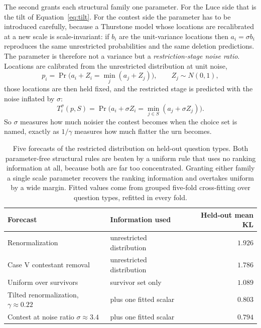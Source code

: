 \documentclass[11pt]{article}
\begin{document}
The second grants each structural family one parameter. For the Luce side that
is the tilt of Equation~\eqref{eq:tilt}. For the contest side the parameter has
to be introduced carefully, because a Thurstone model whose locations are
recalibrated at a new scale is scale-invariant: if $b_i$ are the unit-variance
locations then $a_i = \sigma b_i$ reproduces the same unrestricted
probabilities and the same deletion predictions. The parameter is therefore not
a variance but a \emph{restriction-stage noise ratio}. Locations are calibrated
from the unrestricted distribution at unit noise,
\begin{equation}
p_i = \Pr\bigl(a_i + Z_i = \min_j (a_j + Z_j)\bigr), \qquad Z_j \sim N(0,1),
\label{eq:calib}
\end{equation}
those locations are then held fixed, and the restricted stage is predicted with
the noise inflated by $\sigma$:
\begin{equation}
T^{\sigma}_i(p, S) =
  \Pr\bigl(a_i + \sigma Z_i = \min_{j \in S}(a_j + \sigma Z_j)\bigr).
\label{eq:sigma}
\end{equation}
So $\sigma$ measures how much noisier the contest becomes when the choice set
is named, exactly as $1/\gamma$ measures how much flatter the urn becomes.

\begin{table}[ht]
\centering
\small
\begin{tabular}{llr}
\toprule
Forecast & Information used & Held-out mean KL \\
\midrule
Renormalization & unrestricted distribution & $1.926$ \\
Case V contestant removal & unrestricted distribution & $1.786$ \\
Uniform over survivors & survivor set only & $1.089$ \\
\midrule
Tilted renormalization, $\gamma \approx 0.22$ & plus one fitted scalar & $0.803$ \\
Contest at noise ratio $\sigma \approx 3.4$ & plus one fitted scalar & $\mathbf{0.794}$ \\
\bottomrule
\end{tabular}
\caption{Five forecasts of the restricted distribution on held-out question
types. Both parameter-free structural rules are beaten by a uniform rule that
uses no ranking information at all, because both are far too concentrated.
Granting either family a single scale parameter recovers the ranking
information and overtakes uniform by a wide margin. Fitted values come from
grouped five-fold cross-fitting over question types, refitted in every fold.}
\label{tab:baselines}
\end{table}
\end{document}
